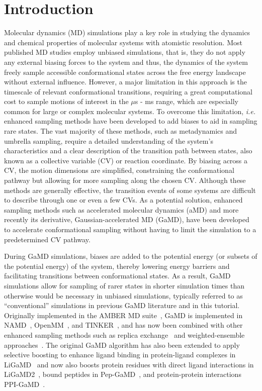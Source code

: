 \documentclass[9pt,tutorial,pubversion]{livecoms}
\begin{document}
\section{Introduction}
Molecular dynamics (MD) simulations play a key role in studying the dynamics and chemical properties of molecular systems with atomistic resolution. Most published MD studies employ unbiased simulations, that is, they do not apply any external biasing forces to the system and thus, the dynamics of the system freely sample accessible conformational states across the free energy landscape without external influence. However, a major limitation in this approach is the timescale of relevant conformational transitions, requiring a great computational cost to sample motions of interest in the $\mu$s - ms range, which are especially common for large or complex molecular systems. To overcome this limitation, \textit{i.e.} enhanced sampling methods have been developed to add biases to aid in sampling rare states. The vast majority of these methods, such as metadynamics and umbrella sampling, require a detailed understanding of the system's characteristics and a clear description of the transition path between states, also known as a collective variable (CV) or reaction coordinate. By biasing across a CV, the motion dimensions are simplified, constraining the conformational pathway but allowing for more sampling along the chosen CV. Although these methods are generally effective, the transition events of some systems are difficult to describe through one or even a few CVs. As a potential solution, enhanced sampling methods such as accelerated molecular dynamics (aMD) and more recently its derivative, Gaussian-accelerated MD (GaMD), have been developed to accelerate conformational sampling without having to limit the simulation to a predetermined CV pathway.

During GaMD simulations, biases are added to the potential energy (or subsets of the potential energy) of the system, thereby lowering energy barriers and facilitating transitions between conformational states. As a result, GaMD simulations allow for sampling of rarer states in shorter simulation times than otherwise would be necessary in unbiased simulations, typically referred to as ``conventional'' simulations in previous GaMD literature and in this tutorial. Originally implemented in the AMBER MD suite~\cite{salomon-ferrer_overview_2013}, GaMD is implemented in NAMD~\cite{miao_gaussian_2015}, OpenMM~\cite{copeland_gaussian_2022}, and TINKER~\cite{celerse_efficient_2022}, and has now been combined with other enhanced sampling methods such as replica exchange~\cite{huang_replica_2018} and weighted-ensemble approaches~\cite{ahn_gaussian-accelerated_2021}. The original GaMD algorithm has also been extended to apply selective boosting to enhance ligand binding in protein-ligand complexes in LiGaMD~\cite{miao_ligand_2020} and now also boosts protein residues with direct ligand interactions in LiGaMD2~\cite{wang_ligand_2023},  bound peptides in Pep-GaMD~\cite{wang_peptide_2020}, and protein-protein interactions PPI-GaMD~\cite{wang_proteinprotein_2022}.
\end{document}
